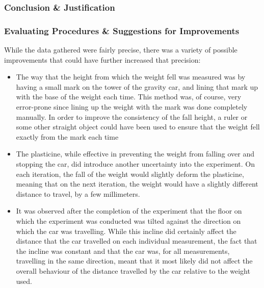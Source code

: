 \documentclass[titlepage,12pt]{article}
\begin{document}
\subsubsection{Conclusion \& Justification}

\subsubsection{Evaluating Procedures \& Suggestions for Improvements}

While the data gathered were fairly precise, there was a variety of possible improvements
that could have further increased that precision:

\begin{itemize}
    \item The way that the height from which the weight fell was measured was by having a
        small mark on the tower of the gravity car, and  lining that mark up with the base
        of the weight each time. This method was, of course, very error-prone since lining
        up the weight with the mark was done completely manually. In order to improve the
        consistency of the fall height, a ruler or some other straight object could have
        been used to ensure that the weight fell exactly from the mark each time

    \item The plasticine, while effective in preventing the weight from falling over and
        stopping the car, did introduce another uncertainty into the experiment. On each
        iteration, the fall of the weight would slightly deform the plasticine, meaning that
        on the next iteration, the weight would have a slightly different distance to
        travel, by a few millimeters. 

    \item It was observed after the completion of the experiment that the floor on which the
        experiment was conducted was tilted against the direction on which the car was
        travelling. While this incline did certainly affect the distance that the car
        travelled on each individual measurement, the fact that the incline was constant and
        that the car was, for all measurements, travelling in the same direction, meant that
        it most likely did not affect the overall behaviour of the distance travelled by the
        car relative to the weight used.  
\end{itemize}
\end{document}
